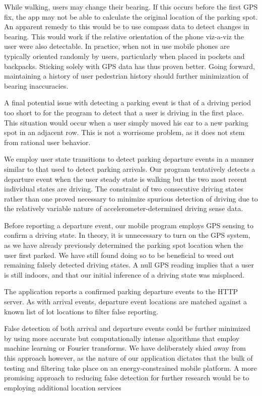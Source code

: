 While walking, users may change their bearing.  If this occurs before the
first GPS fix, the app may not be able to calculate the original location
of the parking spot.  An apparent remedy to this would be to use compass
data to detect changes in bearing.  This would work if the relative
orientation of the phone viz-a-viz the user were also detectable.  In
practice, when not in use mobile phones are typically oriented randomly by
users, particularly when placed in pockets and backpacks.  Sticking solely
with GPS data has thus proven better.  Going forward, maintaining a history
of user pedestrian history should further minimization of bearing
inaccuracies.

A final potential issue with detecting a parking event is that of a driving
period too short to for the program to detect that a user is driving in
the first place.  This situation would occur when a user simply moved his
car to a new parking spot in an adjacent row.  This is not a worrisome
problem, as it does not stem from rational user behavior.

We employ user state transitions to detect parking departure events in a 
manner similar to that used to detect parking arrivals.  Our program
tentatively detects a departure event when the user steady state is walking
but the two most recent individual states are driving.  The constraint of
two consecutive driving states rather than one proved necessary to minimize
spurious detection of driving due to the relatively variable nature of
accelerometer-determined driving sense data.

Before reporting a departure event, our mobile program employs GPS sensing
to confirm a driving state.  In theory, it is unnecessary to turn on the
GPS system, as we have already previously determined the parking spot
location when the user first parked.  We have still found doing so to
be beneficial to weed out remaining falsely detected driving states.  A null
GPS reading implies that a user is still indoors, and that our initial
inference of a driving state was misplaced.

The application reports a confirmed parking departure events to the
HTTP server.  As with arrival events, departure event locations are matched
against a known list of lot locations to filter false reporting.

False detection of both arrival and departure events could be further
minimized by using more accurate but computationally intense algorithms that
employ machine learning or Fourier transforms.  We have deliberately shied
away from this approach however, as the nature of our application dictates
that the bulk of testing and filtering take place on an energy-constrained
mobile platform.  A more promising approach to reducing false detection for
further research would be to employing additional location services







